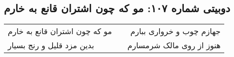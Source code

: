 \begin{center}
\section*{دوبیتی شماره ۱۰۷: مو که چون اشتران قانع به خارم}
\label{sec:107}
\begin{longtable}{l p{0.5cm} r}
مو که چون اشتران قانع به خارم
&&
جهازم چوب و خرواری ببارم
\\
بدین مزد قلیل و رنج بسیار
&&
هنوز از روی مالک شرمسارم
\\
\end{longtable}
\end{center}
